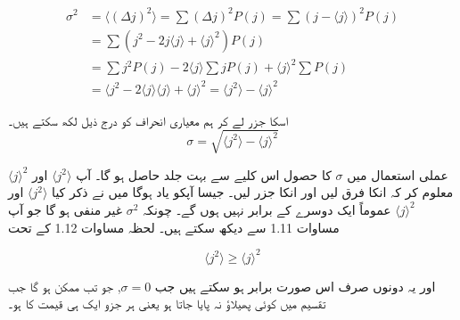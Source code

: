 \begin{align*}
\sigma^{2} &= \langle ( \Delta j )^{2} \rangle = \sum ( \Delta j )^{2} P(j) = \sum (j- \langle j \rangle )^{2} P(j) \\
&= \sum (j^{2} -2j \langle j \rangle + \langle j \rangle ^{2} ) P(j) \\ 
&= \sum j^{2} P(j) -2 \langle j \rangle \sum jP(j) + \langle j \rangle ^{2} \sum P(j) \\ 
&= \langle j^{2} -2\langle j \rangle \langle j \rangle + \langle j \rangle ^{2} = \langle j^{2} \rangle - \langle j \rangle ^{2}
\end{align*}

اسکا جزر لے کر ہم معیاری انحراف کو درج ذیل لکھ سکتے ہیں۔ 
\[ \sigma = \sqrt{\langle j^{2} \rangle - \langle j \rangle ^{2}} \]


عملی استعمال میں \( \sigma \) کا حصول اس کلیے سے بہت جلد حاصل ہو گا۔ آپ \( \langle j^{2} \rangle \) اور \( \langle j \rangle ^{2} \) معلوم کر کہ انکا فرق لیں اور انکا جزر لیں۔ جیسا آپکو یاد ہوگا میں نے ذکر کیا \( \langle j^{2} \rangle \) اور \( \langle j \rangle ^{2} \) عموماً ایک دوسرے کے برابر نہیں ہوں گے۔ چونکہ \( \sigma ^{2} \) غیر منفی ہو گا جو آپ مساوات 1.11 سے دیکھ سکتے ہیں۔ لحظہ مساوات 1.12 کے تحت 

\[ \langle j^2 \rangle \geq \langle j \rangle ^{2} \]

اور یہ دونوں صرف اس صورت برابر ہو سکتے ہیں جب \( \sigma = 0 \),   جو تب ممکن ہو گا جب تقسیم میں کوئی پھیلاؤ نہ پایا جاتا ہو یعنی ہر جزو ایک ہی قیمت کا ہو۔ 

